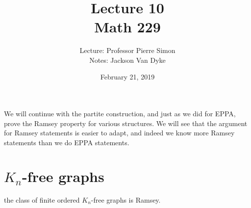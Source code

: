\documentclass{amsart}
\begin{document}
\title{Lecture 10\\Math 229}
\date{February 21, 2019}
\author{Lecture: Professor Pierre Simon\\Notes: Jackson Van Dyke}
\maketitle

We will continue with the partite construction, and just as we did for EPPA, prove the
Ramsey property for various structures.
We will see that the argument for Ramsey statements is easier to adapt, and indeed
we know more Ramsey statements than we do EPPA statements.

\section{$K_n$-free graphs}

\begin{thm}[Ne\v{s}et\v{r}il-R\"odl]
the class of finite ordered $K_n$-free graphs is Ramsey.
\end{thm}
\end{document}
